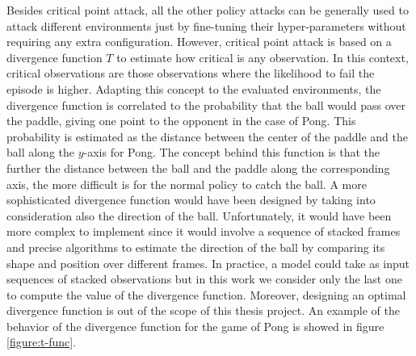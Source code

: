 Besides critical point attack, all the other policy attacks can be generally used to attack different environments just by fine-tuning their hyper-parameters without requiring any extra configuration. However, critical point attack is based on a divergence function \(T\) to estimate how critical is any observation. In this context, critical observations are those observations where the likelihood to fail the episode is higher. Adapting this concept to the evaluated environments, the divergence function is correlated to the probability that the ball would pass over the paddle, giving one point to the opponent in the case of Pong. This probability is estimated as the distance between the center of the paddle and the ball along the \(y\)-axis for Pong. The concept behind this function is that the further the distance between the ball and the paddle along the corresponding axis, the more difficult is for the normal policy to catch the ball. A more sophisticated divergence function would have been designed by taking into consideration also the direction of the ball. Unfortunately, it would have been more complex to implement since it would involve a sequence of stacked frames and precise algorithms to estimate the direction of the ball by comparing its shape and position over different frames. In practice, a model could take as input sequences of stacked observations but in this work we consider only the last one to compute the value of the divergence function. Moreover, designing an optimal divergence function is out of the scope of this thesis project. An example of the behavior of the divergence function for the game of Pong is showed in figure \ref{figure:t-func}.

